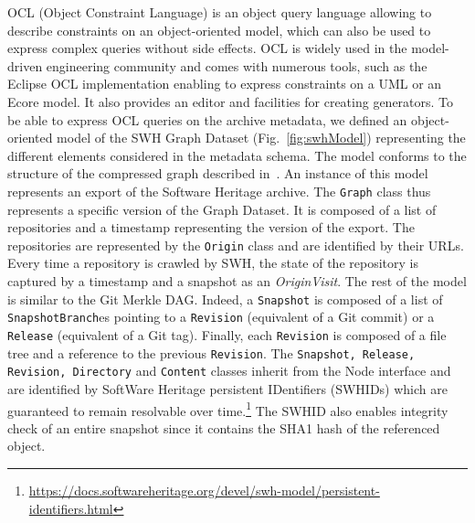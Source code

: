 OCL (Object Constraint Language) is an object query language allowing to describe constraints on an object-oriented model, which can also be used to express complex queries without side effects.
OCL is widely used in the model-driven engineering community and comes with numerous tools, such as the Eclipse OCL implementation enabling to express constraints on a UML or an Ecore model.
It also provides an editor and facilities for creating generators. 
To be able to express OCL queries on the archive metadata,   
we defined an object-oriented model of the SWH Graph Dataset (Fig.~\ref{fig:swhModel}) representing the different elements considered in the metadata schema. 
The model conforms to the structure of the compressed graph described in~\cite[Chapter 10]{pietri:tel-03515795}.
An instance of this model represents an export of the Software Heritage archive.
The \texttt{Graph} class thus represents a specific version of the Graph Dataset.
It is composed of a list of repositories and a timestamp representing the version of the export. 
The repositories are represented by the \texttt{Origin} class and are identified by their URLs.
Every time a repository is crawled by SWH, the state of the repository is captured by a timestamp and a snapshot as an \textit{OriginVisit}. 
The rest of the model is similar to the Git Merkle DAG. 
Indeed, a \texttt{Snapshot} is composed of a list of \texttt{SnapshotBranch}es pointing to a \texttt{Revision} (equivalent of a Git commit) or a \texttt{Release} (equivalent of a Git tag). 
Finally, each \texttt{Revision} is composed of a file tree and a reference to the previous \texttt{Revision}. 
The \texttt{Snapshot, Release, Revision, Directory} and \texttt{Content} classes inherit from the Node interface and are identified by SoftWare Heritage persistent IDentifiers (SWHIDs) which are guaranteed to remain resolvable over time.\footnote{\url{https://docs.softwareheritage.org/devel/swh-model/persistent-identifiers.html}} The SWHID also enables integrity check of an entire snapshot since it contains the SHA1 hash of the referenced object.


